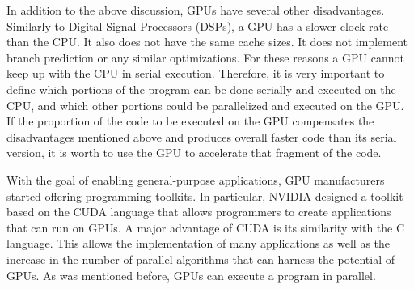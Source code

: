 \documentclass[Ingles]{ic-tese-v1}
\begin{document}
In addition to the above discussion, GPUs have several other
disadvantages.  Similarly to Digital Signal Processors (DSPs), a GPU has a
slower clock rate than the CPU. It also does not have the same cache sizes.
It does not implement branch prediction or any similar optimizations. For these
reasons a GPU cannot keep up with the CPU in serial
execution. Therefore, it is very important to define which portions of
the program can be done serially and executed on the CPU, and which other
portions could be parallelized and executed on the GPU. If the proportion of
the code to be executed on the GPU compensates the disadvantages mentioned
above and produces overall faster code than its serial version, it is worth to use the
GPU to accelerate  that fragment of the code.

With the goal of enabling general-purpose applications, GPU manufacturers
started offering programming  toolkits. In particular, NVIDIA designed a toolkit
based on the CUDA  language that  allows programmers to create applications
that can run on GPUs. A major advantage
of CUDA is its similarity with the C language.  This allows the implementation
of many applications as well as the increase in the number of parallel
algorithms that can  harness the potential of GPUs. As was mentioned before, GPUs
can execute a program in parallel.
\end{document}
